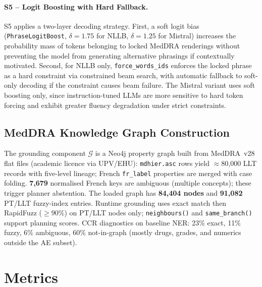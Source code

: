\documentclass[11pt,a4paper,twocolumn]{article}
\begin{document}
\paragraph{S5 -- Logit Boosting with Hard Fallback.}
S5 applies a two-layer decoding strategy. First, a soft logit bias
(\texttt{PhraseLogitBoost}, $\delta{=}1.75$ for NLLB, $\delta{=}1.25$ for
Mistral) increases the probability mass of tokens belonging to locked MedDRA
renderings without preventing the model from generating alternative phrasings
if contextually motivated. Second, for NLLB only, \texttt{force\_words\_ids}
enforces the locked phrase as a hard constraint via constrained beam search,
with automatic fallback to soft-only decoding if the constraint causes beam
failure. The Mistral variant uses soft boosting only, since instruction-tuned
LLMs are more sensitive to hard token forcing and exhibit greater fluency
degradation under strict constraints.

\subsection{MedDRA Knowledge Graph Construction}
\label{sec:graph-construction}

The grounding component $\mathcal{G}$ is a Neo4j property graph built from
MedDRA~v28 flat files (academic licence via UPV/EHU): \texttt{mdhier.asc}
rows yield $\approx$80{,}000 LLT records with five-level lineage; French
\texttt{fr\_label} properties are merged with case folding.
\textbf{7{,}679} normalised French keys are ambiguous (multiple concepts);
these trigger planner abstention.
The loaded graph has \textbf{84{,}404 nodes} and \textbf{91{,}082} PT/LLT
fuzzy-index entries.
Runtime grounding uses exact match then RapidFuzz ($\geq\!90\%$) on
PT/LLT nodes only; \texttt{neighbours()} and \texttt{same\_branch()}
support planning scores.
CCR diagnostics on baseline NER: 23\% exact, 11\% fuzzy, 6\% ambiguous,
60\% not-in-graph (mostly drugs, grades, and numerics outside the AE subset).

\section{Metrics}
\label{sec:metrics}
\end{document}
